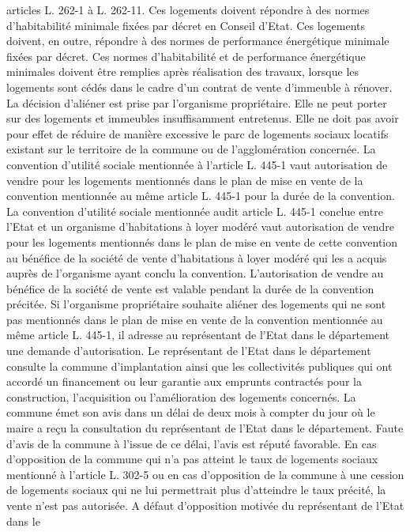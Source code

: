 \documentclass[11pt,a4paper]{report}
\begin{document}
	articles L. 262-1 à L. 262-11. Ces logements doivent répondre à des normes d'habitabilité minimale fixées par
	décret en Conseil d'Etat. Ces logements doivent, en outre, répondre à des normes de performance énergétique
	minimale fixées par décret. Ces normes d'habitabilité et de performance énergétique minimales doivent être
	remplies après réalisation des travaux, lorsque les logements sont cédés dans le cadre d'un contrat de vente
	d'immeuble à rénover.
	La décision d'aliéner est prise par l'organisme propriétaire. Elle ne peut porter sur des logements et immeubles
	insuffisamment entretenus. Elle ne doit pas avoir pour effet de réduire de manière excessive le parc de logements
	sociaux locatifs existant sur le territoire de la commune ou de l'agglomération concernée.
	La convention d'utilité sociale mentionnée à l'article L. 445-1 vaut autorisation de vendre pour les logements
	mentionnés dans le plan de mise en vente de la convention mentionnée au même article L. 445-1 pour la
	durée de la convention.
	La convention d'utilité sociale mentionnée audit article L. 445-1 conclue entre l'Etat et un organisme
	d'habitations à loyer modéré vaut autorisation de vendre pour les logements mentionnés dans le plan de mise en
	vente de cette convention au bénéfice de la société de vente d'habitations à loyer modéré qui les a acquis auprès
	de l'organisme ayant conclu la convention. L'autorisation de vendre au bénéfice de la société de vente est
	valable pendant la durée de la convention précitée.
	Si l'organisme propriétaire souhaite aliéner des logements qui ne sont pas mentionnés dans le plan de mise en
	vente de la convention mentionnée au même article L. 445-1, il adresse au représentant de l'Etat dans le
	département une demande d'autorisation. Le représentant de l'Etat dans le département consulte la commune
	d'implantation ainsi que les collectivités publiques qui ont accordé un financement ou leur garantie aux
	emprunts contractés pour la construction, l'acquisition ou l'amélioration des logements concernés. La commune
	émet son avis dans un délai de deux mois à compter du jour où le maire a reçu la consultation du représentant
	de l'Etat dans le département. Faute d'avis de la commune à l'issue de ce délai, l'avis est réputé favorable. En
	cas d'opposition de la commune qui n'a pas atteint le taux de logements sociaux mentionné à l'article L. 302-5
	ou en cas d'opposition de la commune à une cession de logements sociaux qui ne lui permettrait plus d'atteindre
	le taux précité, la vente n'est pas autorisée. A défaut d'opposition motivée du représentant de l'Etat dans le
\end{document}
